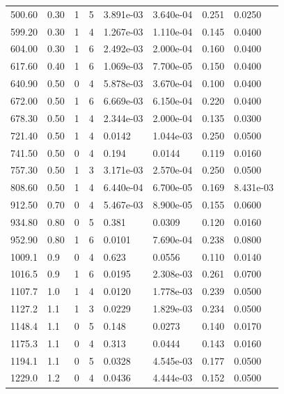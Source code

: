 \documentclass[preview]{standalone}
\begin{document}
{{\begin{tabular}{L{1.2cm}C{1.2cm} C{0.3cm}C{0.5cm} C{1.4cm}C{1.4cm} C{1.4cm}C{1.4cm}}
  500.60  &  0.30  & 1     &  5 &  3.891e-03  & 3.640e-04  & 0.251 &  0.0250   \\ 
  599.20  &  0.30  & 1     &  4 &  1.267e-03  & 1.110e-04  & 0.145 &  0.0400   \\ 
  604.00  &  0.30  & 1     &  6 &  2.492e-03  & 2.000e-04  & 0.160 &  0.0400   \\ 
  617.60  &  0.40  & 1     &  6 &  1.069e-03  & 7.700e-05  & 0.150 &  0.0400   \\ 
  640.90  &  0.50  & 0     &  4 &  5.878e-03  & 3.670e-04  & 0.100 &  0.0400   \\ 
  672.00  &  0.50  & 1     &  6 &  6.669e-03  & 6.150e-04  & 0.220 &  0.0400   \\ 
  678.30  &  0.50  & 1     &  4 &  2.344e-03  & 2.000e-04  & 0.135 &  0.0300   \\ 
  721.40  &  0.50  & 1     &  4 &  0.0142  & 1.044e-03  & 0.250 &  0.0500   \\ 
  741.50  &  0.50  & 0     &  4 &  0.194  & 0.0144  & 0.119 &  0.0160   \\ 
  757.30  &  0.50  & 1     &  3 &  3.171e-03  & 2.570e-04  & 0.250 &  0.0500   \\ 
  808.60  &  0.50  & 1     &  4 &  6.440e-04  & 6.700e-05  & 0.169 &  8.431e-03   \\ 
  912.50  &  0.70  & 0     &  4 &  5.467e-03  & 8.900e-05  & 0.155 &  0.0600   \\ 
  934.80  &  0.80  & 0     &  5 &  0.381  & 0.0309  & 0.120 &  0.0160   \\ 
  952.90  &  0.80  & 1     &  6 &  0.0101  & 7.690e-04  & 0.238 &  0.0800   \\ 
  1009.1  &   0.9  & 0     &  4 &  0.623  & 0.0556  & 0.110 &  0.0140   \\ 
  1016.5  &   0.9  & 1     &  6 &  0.0195  & 2.308e-03  & 0.261 &  0.0700   \\ 
  1107.7  &   1.0  & 1     &  4 &  0.0120  & 1.778e-03  & 0.239 &  0.0500   \\ 
  1127.2  &   1.1  & 1     &  3 &  0.0229  & 1.829e-03  & 0.234 &  0.0500   \\ 
  1148.4  &   1.1  & 0     &  5 &  0.148  & 0.0273  & 0.140 &  0.0170   \\ 
  1175.3  &   1.1  & 0     &  4 &  0.313  & 0.0444  & 0.143 &  0.0160   \\ 
  1194.1  &   1.1  & 0     &  5 &  0.0328  & 4.545e-03  & 0.177 &  0.0500   \\ 
  1229.0  &   1.2  & 0     &  4 &  0.0436  & 4.444e-03  & 0.152 &  0.0500   \\ 

\end{tabular}}}
\end{document}
